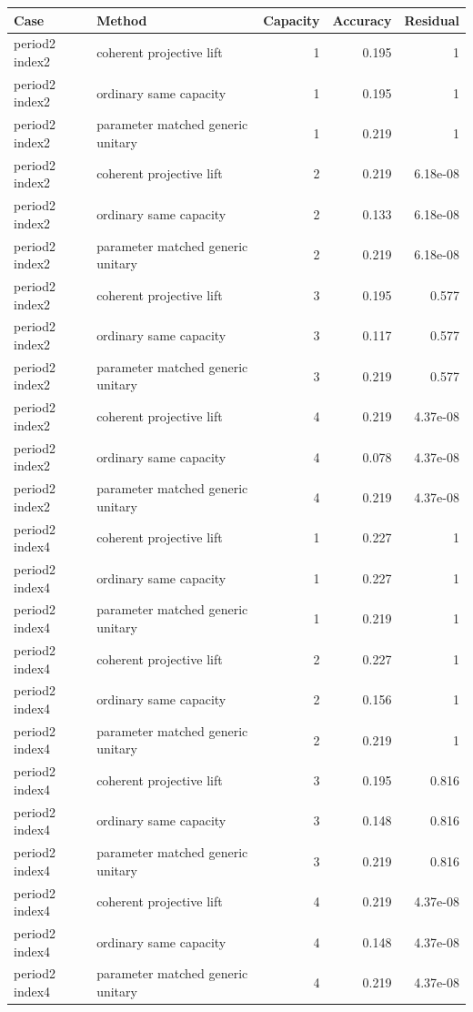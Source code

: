 \begin{tabular}{llrrr}
\toprule
Case & Method & Capacity & Accuracy & Residual\\
\midrule
period2 index2 & coherent projective lift & 1 & 0.195 & 1\\
period2 index2 & ordinary same capacity & 1 & 0.195 & 1\\
period2 index2 & parameter matched generic unitary & 1 & 0.219 & 1\\
period2 index2 & coherent projective lift & 2 & 0.219 & 6.18e-08\\
period2 index2 & ordinary same capacity & 2 & 0.133 & 6.18e-08\\
period2 index2 & parameter matched generic unitary & 2 & 0.219 & 6.18e-08\\
period2 index2 & coherent projective lift & 3 & 0.195 & 0.577\\
period2 index2 & ordinary same capacity & 3 & 0.117 & 0.577\\
period2 index2 & parameter matched generic unitary & 3 & 0.219 & 0.577\\
period2 index2 & coherent projective lift & 4 & 0.219 & 4.37e-08\\
period2 index2 & ordinary same capacity & 4 & 0.078 & 4.37e-08\\
period2 index2 & parameter matched generic unitary & 4 & 0.219 & 4.37e-08\\
period2 index4 & coherent projective lift & 1 & 0.227 & 1\\
period2 index4 & ordinary same capacity & 1 & 0.227 & 1\\
period2 index4 & parameter matched generic unitary & 1 & 0.219 & 1\\
period2 index4 & coherent projective lift & 2 & 0.227 & 1\\
period2 index4 & ordinary same capacity & 2 & 0.156 & 1\\
period2 index4 & parameter matched generic unitary & 2 & 0.219 & 1\\
period2 index4 & coherent projective lift & 3 & 0.195 & 0.816\\
period2 index4 & ordinary same capacity & 3 & 0.148 & 0.816\\
period2 index4 & parameter matched generic unitary & 3 & 0.219 & 0.816\\
period2 index4 & coherent projective lift & 4 & 0.219 & 4.37e-08\\
period2 index4 & ordinary same capacity & 4 & 0.148 & 4.37e-08\\
period2 index4 & parameter matched generic unitary & 4 & 0.219 & 4.37e-08\\

\end{tabular}
